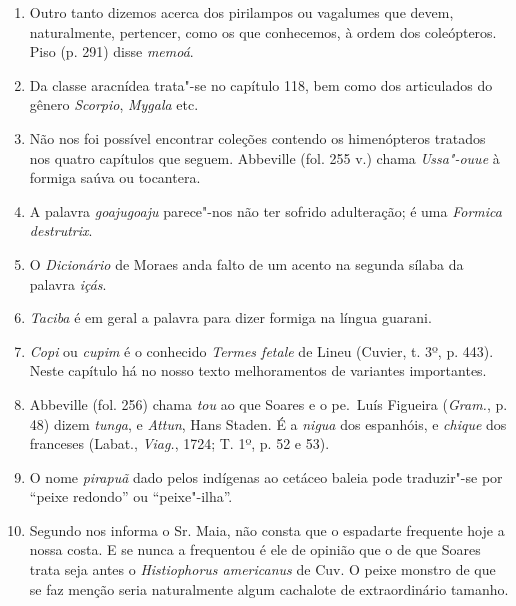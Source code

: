 \begin{enumerate}
\item Outro tanto dizemos acerca dos pirilampos ou vagalumes que devem, 
naturalmente, pertencer, como os que conhecemos, à ordem dos coleópteros. Piso 
(p. 291) disse \textit{memoá}.

\item Da classe aracnídea trata"-se no capítulo 118, bem como dos articulados do 
gênero \textit{Scorpio}, \textit{Mygala} etc.

\item Não nos foi possível encontrar coleções contendo os himenópteros tratados nos 
quatro capítulos que seguem. Abbeville (fol. 255 v.) chama \textit{Ussa"-ouue} à formiga 
saúva ou tocantera.

\item A palavra \textit{goajugoaju} parece"-nos não ter sofrido adulteração; é uma \textit{Formica destrutrix}.

\item O \textit{Dicionário} de Moraes anda falto de um acento na segunda sílaba da palavra \textit{içás}.

\item  \textit{Taciba} é em geral a palavra para dizer formiga na língua guarani.

\item \textit{Copi} ou \textit{cupim} é o conhecido \textit{Termes fetale} de Lineu (Cuvier, t. 3º, p. 443). 
Neste capítulo há no nosso texto melhoramentos de variantes importantes.

\item Abbeville (fol. 256) chama \textit{tou} ao que Soares e o pe.~Luís Figueira (\textit{Gram.}, p. 48) 
dizem \textit{tunga}, e \textit{Attun}, Hans Staden. É a \textit{nigua} dos espanhóis, e \textit{chique} dos franceses 
(Labat., \textit{Viag.}, 1724; T. 1º, p. 52 e 53).

\item O nome \textit{pirapuã} dado pelos indígenas ao cetáceo baleia pode traduzir"-se por ``peixe redondo'' ou ``peixe"-ilha''. 

\item Segundo nos informa o Sr. Maia, não consta que o espadarte frequente hoje a 
nossa costa. E se nunca a frequentou é ele de opinião que o de que Soares trata seja 
antes o \textit{Histiophorus americanus} de Cuv. O peixe monstro de que se faz menção seria 
naturalmente algum cachalote de extraordinário tamanho.


\end{enumerate}
